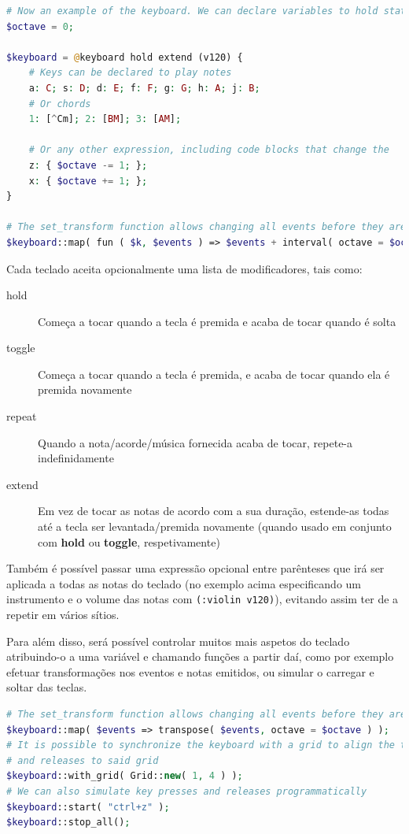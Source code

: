 \begin{lstlisting}[caption=Exemplo da sintaxe de teclados virtuais,language=PHP]
# Now an example of the keyboard. We can declare variables to hold state
$octave = 0;

$keyboard = @keyboard hold extend (v120) {
    # Keys can be declared to play notes
    a: C; s: D; d: E; f: F; g: G; h: A; j: B;
    # Or chords
    1: [^Cm]; 2: [BM]; 3: [AM];
    
    # Or any other expression, including code blocks that change the    state
    z: { $octave -= 1; };
    x: { $octave += 1; };
}

# The set_transform function allows changing all events before they are emitted by this keyboard
$keyboard::map( fun ( $k, $events ) => $events + interval( octave = $octave ) );
\end{lstlisting}

Cada\label{modifiers} teclado aceita opcionalmente uma lista de modificadores, tais como:
\begin{description}
    \item[hold] Começa a tocar quando a tecla é premida e acaba de tocar quando é solta
    \item[toggle] Começa a tocar quando a tecla é premida, e acaba de tocar quando ela é premida novamente
    \item[repeat] Quando a nota/acorde/música fornecida acaba de tocar, repete-a indefinidamente
    \item[extend] Em vez de tocar as notas de acordo com a sua duração, estende-as todas até a tecla ser levantada/premida novamente (quando usado em conjunto com \textbf{hold} ou \textbf{toggle}, respetivamente)
\end{description}

Também é possível passar uma expressão opcional entre parênteses que irá ser aplicada a todas as notas do teclado (no exemplo acima especificando um instrumento e o volume das notas com \texttt{(:violin v120)}), evitando assim ter de a repetir em vários sítios.

Para além disso, será possível controlar muitos mais aspetos do teclado atribuindo-o a uma variável e chamando funções a partir daí, como por exemplo efetuar transformações nos eventos e notas emitidos, ou simular o carregar e soltar das teclas.

\begin{lstlisting}[caption=Exemplo da sintaxe proposta da linguagem,language=PHP]
# The set_transform function allows changing all events before they are emitted by this keyboard
$keyboard::map( $events => transpose( $events, octave = $octave ) );
# It is possible to synchronize the keyboard with a grid to align the timings of key presses 
# and releases to said grid
$keyboard::with_grid( Grid::new( 1, 4 ) );
# We can also simulate key presses and releases programmatically
$keyboard::start( "ctrl+z" );
$keyboard::stop_all();

\end{lstlisting}

